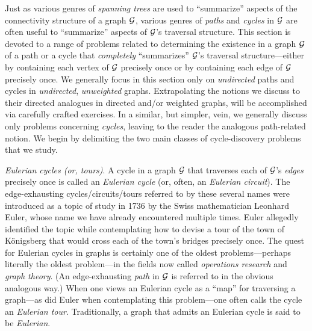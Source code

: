 Just as various genres of {\it spanning trees} are used to
``summarize'' aspects of the connectivity structure of a 
graph $\mbox{$\cal G$}$, various genres of {\it paths} and {\it cycles} in $\mbox{$\cal G$}$ are
often useful to ``summarize'' aspects of $\mbox{$\cal G$}$'s traversal structure.
This section is devoted to a range of problems related to determining
the existence in a graph $\mbox{$\cal G$}$ of a path or a cycle that {\em completely} ``summarizes'' $\mbox{$\cal G$}$'s 
traversal structure---either by containing each vertex of $\mbox{$\cal G$}$ precisely once or by containing
each edge of $\mbox{$\cal G$}$ precisely once.  We generally focus in this section only
on {\em undirected} paths and cycles in {\em undirected}, {\em unweighted} graphs.
Extrapolating the notions we discuss to their directed analogues in directed and/or weighted
graphs, will be accomplished via carefully crafted exercises.  In a similar, but simpler, vein, we 
generally discuss only problems concerning {\em cycles}, leaving to the reader
the analogous path-related notion.  We begin by delimiting the two main
classes of cycle-discovery problems that we study.

\smallskip

 
  
{\it Eulerian cycles (or, tours)}.  A cycle in a graph $\mbox{$\cal G$}$ that traverses each of $\mbox{$\cal G$}$'s {\em edges} 
precisely once is called an {\it Eulerian cycle} (or, often, an {\it Eulerian circuit}).  The 
edge-exhausting cycles/circuits/tours referred to by these several names were introduced
as a topic of study in 1736  by the Swiss mathematician Leonhard Euler, whose name we 
have already encountered multiple times.  Euler allegedly identified the topic
while contemplating how to devise a tour of the town of K\"{o}nigsberg
that would cross each of the town's bridges precisely once.  The quest
for Eulerian cycles in graphs is certainly one of the oldest problems---perhaps literally the oldest 
problem---in the fields now called {\it operations research} and {\it graph theory}.  
(An edge-exhausting {\em path} in $\mbox{$\cal G$}$ is referred to in the obvious analogous way.)  When one 
views an Eulerian cycle as a ``map'' for traversing a graph---as did Euler when contemplating this
problem---one often calls the cycle an {\it Eulerian tour}. Traditionally, a
graph that admits an Eulerian cycle is said to be {\it Eulerian}. 
  
  

\medskip

